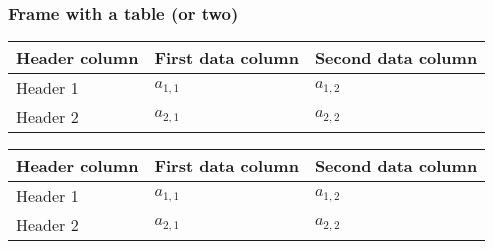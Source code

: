 \documentclass[tikz, aspectratio=169]{beamer}
\begin{document}
\begin{frame}
\frametitle{Frame with a table (or two)}
\begin{center}
\begin{tabular}{l | l l }
\toprule
Header column & First data column & Second data column \\
\midrule
Header 1 & \(a_{1,1}\) & \(a_{1,2}\) \\
Header 2 & \(a_{2,1}\) & \(a_{2,2}\) \\
\bottomrule
\end{tabular}
\end{center}
\begin{center}
\begin{tabular}{l | l l }
\toprule
Header column & First data column & Second data column \\
\midrule
Header 1 & \(a_{1,1}\) & \(a_{1,2}\) \\
Header 2 & \(a_{2,1}\) & \(a_{2,2}\) \\
\bottomrule
\end{tabular}
\end{center}
\end{frame}
\end{document}

